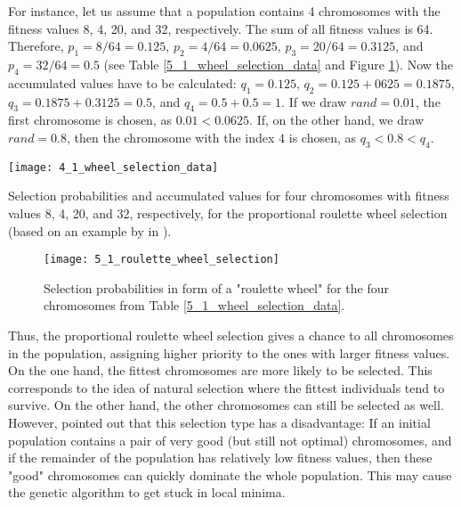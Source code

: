 For instance, let us assume that a population contains 4 chromosomes with the fitness values 8, 4, 20, and 32, respectively. The sum of all fitness values is 64. Therefore,  $p_{1} = 8/64 = 0.125$, $p_{2} = 4/64 = 0.0625$, $p_{3} = 20/64 = 0.3125$, and $p_{4} = 32/64 = 0.5$ (see Table \ref{5_1_wheel_selection_data} and Figure \ref{5_1_wheel_selection}). Now the accumulated values have to be calculated: $q_{1} =  0.125$, $q_{2} = 0.125 + 0625 = 0.1875$, $q_{3} = 0.1875 + 0.3125 = 0.5$, and $q_{4} = 0.5 + 0.5 = 1$. If we draw $rand = 0.01$, the first chromosome is chosen, as $0.01 < 0.0625$. If, on the other hand, we draw $rand = 0.8$, then the chromosome with the index $4$ is chosen, as $q_{3} < 0.8 <  q_{4}$. \\

\begin{table}[htp] \centering
	\centering
	\texttt{[image: 4\_1\_wheel\_selection\_data]}
	\caption{Selection probabilities and accumulated values for four chromosomes with fitness values 8, 4, 20, and 32, respectively, for the proportional roulette wheel selection (based on an example by \citeauthor{knust2020script} in \cite{knust2020script}).}
	\label{5_1_wheel_selection_data}
\end{table}


\begin{figure}[htp] \centering
	\centering
	\texttt{[image: 5\_1\_roulette\_wheel\_selection]}
	\caption{Selection probabilities in form of a "roulette wheel" for the four chromosomes from Table \ref{5_1_wheel_selection_data}.}
	\label{5_1_wheel_selection}
\end{figure}


Thus, the proportional roulette wheel selection gives a chance to all chromosomes in the population, assigning higher priority to the ones with larger fitness values. On the one hand, the fittest chromosomes are more likely to be selected. This corresponds to the idea of natural selection where the fittest individuals tend to survive. On the other hand, the other chromosomes can still be selected as well. However, \citeauthor{razali2011genetic} \cite{razali2011genetic} pointed out that this selection type has a disadvantage: If an initial population contains a pair of very good (but still not optimal) chromosomes, and if the remainder of the population has relatively low fitness values, then these "good" chromosomes can quickly dominate the whole population. This may cause the genetic algorithm to get stuck in local minima. \par 

